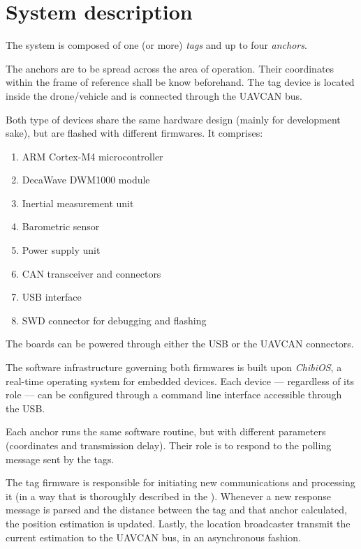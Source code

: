 \section{System description}

The system is composed of one (or more) \emph{tags} and up to four \emph{anchors}.

The anchors are to be spread across the area of operation.
Their coordinates within the frame of reference shall be know beforehand.
The tag device is located inside the drone/vehicle and is connected through the UAVCAN bus.

Both type of devices share the same hardware design (mainly for development sake), but are flashed with different firmwares.
It comprises:
\begin{enumerate}
\item ARM Cortex-M4 microcontroller
\item DecaWave DWM1000 module
\item Inertial measurement unit
\item Barometric sensor
\item Power supply unit
\item CAN transceiver and connectors
\item USB interface
\item SWD connector for debugging and flashing
\end{enumerate}
The boards can be powered through either the USB or the UAVCAN connectors.

The software infrastructure governing both firmwares is built upon \emph{ChibiOS}, a real-time operating system for embedded devices.
Each device --- regardless of its role --- can be configured through a command line interface accessible through the USB.

Each anchor runs the same software routine, but with different parameters (coordinates and transmission delay).
Their role is to respond to the polling message sent by the tags.

The tag firmware is responsible for initiating new communications and processing it (in a way that is thoroughly described in the ).
Whenever a new response message is parsed and the distance between the tag and that anchor calculated, the position estimation is updated.
Lastly, the location broadcaster transmit the current estimation to the UAVCAN bus, in an asynchronous fashion.
